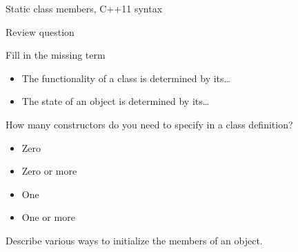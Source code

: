 \begin{block}{Static class members, C++11 syntax}
  \label{sl:static-member11}
\end{block}

 {Review question}

\begin{exercise}
  \label{ex:class-review1}
  Fill in the missing term
  \begin{itemize}
  \item The functionality of a class is determined by its\ldots
  \item The state of an object is determined by its\ldots
  \end{itemize}

  How many constructors do you need to specify in a class definition?
  \begin{itemize}
  \item Zero
  \item Zero or more
  \item One
  \item One or more
  \end{itemize}
\end{exercise}

\begin{exercise}
  \label{ex:class-review2}
  Describe various ways to initialize the members of an object.
\end{exercise}
